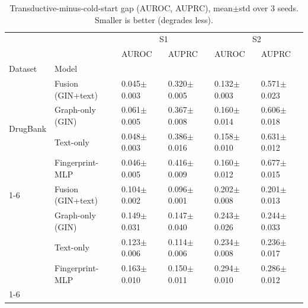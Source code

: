 \begin{table}[t]
\caption{Transductive-minus-cold-start gap (AUROC, AUPRC), mean$\pm$std over 3 seeds. Smaller is better (degrades less).}
\label{tab:gap}
\begin{tabular}{llllll}
\toprule
 &  & \multicolumn{2}{c}{S1} & \multicolumn{2}{c}{S2} \\
 &  & AUROC & AUPRC & AUROC & AUPRC \\
Dataset & Model &  &  &  &  \\
\midrule
\multirow[t]{4}{*}{DrugBank} & Fusion (GIN+text) & 0.045$\pm$0.003 & 0.320$\pm$0.005 & 0.132$\pm$0.003 & 0.571$\pm$0.023 \\
 & Graph-only (GIN) & 0.061$\pm$0.005 & 0.367$\pm$0.008 & 0.160$\pm$0.014 & 0.606$\pm$0.018 \\
 & Text-only & 0.048$\pm$0.003 & 0.386$\pm$0.016 & 0.158$\pm$0.010 & 0.631$\pm$0.012 \\
 & Fingerprint-MLP & 0.046$\pm$0.005 & 0.416$\pm$0.009 & 0.160$\pm$0.012 & 0.677$\pm$0.015 \\
\cline{1-6}
\multirow[t]{4}{*}{BioSNAP} & Fusion (GIN+text) & 0.104$\pm$0.002 & 0.096$\pm$0.001 & 0.202$\pm$0.008 & 0.201$\pm$0.013 \\
 & Graph-only (GIN) & 0.149$\pm$0.031 & 0.147$\pm$0.040 & 0.243$\pm$0.026 & 0.244$\pm$0.033 \\
 & Text-only & 0.123$\pm$0.006 & 0.114$\pm$0.006 & 0.234$\pm$0.008 & 0.236$\pm$0.017 \\
 & Fingerprint-MLP & 0.163$\pm$0.010 & 0.150$\pm$0.011 & 0.294$\pm$0.010 & 0.286$\pm$0.012 \\
\cline{1-6}
\bottomrule
\end{tabular}
\end{table}

